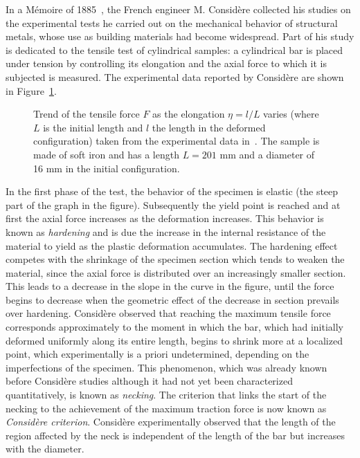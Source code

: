 \documentclass[a4paper,10pt,oneside]{amsbook}
\numberwithin{section}{chapter}
\numberwithin{equation}{chapter}
\theoremstyle{definition}
\begin{document}
In a Mémoire of 1885~\cite{Considere1885}, the French engineer M. Considère collected his studies on the experimental tests he carried out on the mechanical behavior of structural metals, whose use as building materials had become widespread. Part of his study is dedicated to the tensile test of cylindrical samples: a cylindrical bar is placed under tension by controlling its elongation and the axial force to which it is subjected is measured. The experimental data reported by Considère are shown in Figure~\ref{fig:considere}.
\begin{figure}[h]
\caption{Trend of the tensile force $F$ as the elongation $\eta=l/L$ varies (where $L$ is the initial length and $l$ the length in the deformed configuration) taken from the experimental data in~\cite{Considere1885}. The sample is made of soft iron and has a length $L=201$ mm and a diameter of 16 mm in the initial configuration.}
\label{fig:considere}
\end{figure}
In the first phase of the test, the behavior of the specimen is elastic (the steep part of the graph in the figure). Subsequently the yield point is reached and at first the axial force increases as the deformation increases. This behavior is known as \emph{hardening} and is due the increase in the internal resistance of the material to yield as the plastic deformation accumulates. The hardening effect competes with the shrinkage of the specimen section which tends to weaken the material, since the axial force is distributed over an increasingly smaller section. This leads to a decrease in the slope in the curve in the figure, until the force begins to decrease when the geometric effect of the decrease in section prevails over hardening. Considère observed that reaching the maximum tensile force corresponds approximately to the moment in which the bar, which had initially deformed uniformly along its entire length, begins to shrink more at a localized point, which experimentally is a priori undetermined, depending on the imperfections of the specimen. This phenomenon, which was already known before Considère studies although it had not yet been characterized quantitatively, is known as \emph{necking}. The criterion that links the start of the necking to the achievement of the maximum traction force is now known as \emph{Considère criterion}. Considère experimentally observed that the length of the region affected by the neck is independent of the length of the bar but increases with the diameter.
\end{document}
